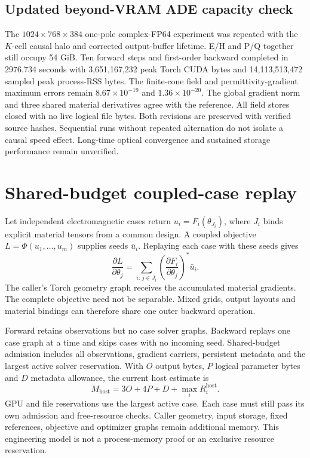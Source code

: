 \documentclass[11pt,a4paper]{article}
\begin{document}
\subsection{Updated beyond-VRAM ADE capacity check}
The $1024\times768\times384$ one-pole complex-FP64 experiment was repeated
with the $K$-cell causal halo and corrected output-buffer lifetime. E/H and
P/Q together still occupy 54 GiB. Ten forward steps and first-order backward
completed in 2976.734 seconds with 3,651,167,232 peak Torch CUDA bytes and
14,113,513,472 sampled peak process-RSS bytes. The finite-cone field and
permittivity-gradient maximum errors remain $8.67\times10^{-19}$ and
$1.36\times10^{-20}$. The global gradient norm and three shared material
derivatives agree with the reference. All field stores closed with no live
logical file bytes. Both revisions are preserved with verified source hashes.
Sequential runs without repeated alternation do not isolate a causal speed
effect. Long-time optical convergence and sustained storage performance
remain unverified.

\section{Shared-budget coupled-case replay}
Let independent electromagnetic cases return $u_i=F_i(\theta_{J_i})$, where
$J_i$ binds explicit material tensors from a common design. A coupled objective
$L=\Phi(u_1,\ldots,u_m)$ supplies seeds $\bar u_i$. Replaying each case with
these seeds gives
\begin{equation}
 \frac{\partial L}{\partial\theta_j}
 =\sum_{i:\,j\in J_i}
 \left(\frac{\partial F_i}{\partial\theta_j}\right)^{*}\bar u_i.
\end{equation}
The caller's Torch geometry graph receives the accumulated material gradients.
The complete objective need not be separable. Mixed grids, output layouts and
material bindings can therefore share one outer backward operation.

Forward retains observations but no case solver graphs. Backward replays one
case graph at a time and skips cases with no incoming seed. Shared-budget
admission includes all observations, gradient carriers, persistent metadata
and the largest active solver reservation. With $O$ output bytes, $P$ logical
parameter bytes and $D$ metadata allowance, the current host estimate is
\begin{equation}
 M_{\mathrm{host}}=3O+4P+D+\max_i R_i^{\mathrm{host}}.
\end{equation}
GPU and file reservations use the largest active case. Each case must still
pass its own admission and free-resource checks. Caller geometry, input
storage, fixed references, objective and optimizer graphs remain additional
memory. This engineering model is not a process-memory proof or an exclusive
resource reservation.
\end{document}
